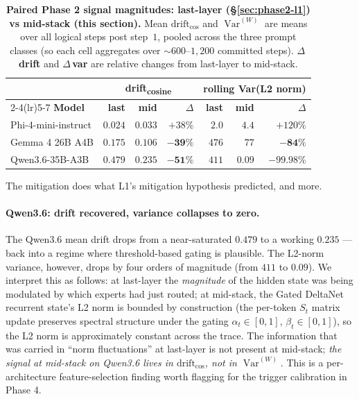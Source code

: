 \documentclass[11pt,letterpaper]{article}
\newcommand{\drift}{\mathrm{drift}_{\cos}}
\newcommand{\Var}{\operatorname{Var}}
\begin{document}
\begin{table}[t]
\centering
\small
\caption{
\textbf{Paired Phase 2 signal magnitudes: last-layer (\S\ref{sec:phase2-l1})
vs mid-stack (this section).}
Mean $\drift$ and $\Var^{(W)}$ are means over all logical steps post
step~$1$, pooled across the three prompt classes (so each cell
aggregates over $\sim 600$--$1{,}200$ committed steps).
\textbf{$\Delta$\,drift} and \textbf{$\Delta$\,var} are relative
changes from last-layer to mid-stack.
}
\label{tab:phase2-paired}
\setlength{\tabcolsep}{4pt}
\begin{tabular}{lrrrrrr}
\toprule
& \multicolumn{3}{c}{\textbf{drift\textsubscript{cosine}}} &
  \multicolumn{3}{c}{\textbf{rolling Var(L2 norm)}} \\
\cmidrule(lr){2-4}\cmidrule(lr){5-7}
\textbf{Model} &
\textbf{last} & \textbf{mid} & \textbf{$\Delta$} &
\textbf{last} & \textbf{mid} & \textbf{$\Delta$} \\
\midrule
Phi-4-mini-instruct & $0.024$ & $0.033$ & $+38\%$ & $2.0$ & $4.4$ & $+120\%$ \\
Gemma 4 26B A4B & $0.175$ & $0.106$ & $\mathbf{-39\%}$ & $476$ & $77$ & $\mathbf{-84\%}$ \\
Qwen3.6-35B-A3B & $\mathbf{0.479}$ & $\mathbf{0.235}$ & $\mathbf{-51\%}$ & $411$ & $\mathbf{0.09}$ & $\mathbf{-99.98\%}$ \\
\bottomrule
\end{tabular}
\end{table}

The mitigation does what L1's mitigation hypothesis predicted, and
more.

\paragraph{Qwen3.6: drift recovered, variance collapses to zero.}
The Qwen3.6 mean drift drops from a near-saturated $0.479$ to a working
$0.235$ — back into a regime where threshold-based gating is plausible.
The L2-norm variance, however, drops by four orders of magnitude
(from $411$ to $0.09$). We interpret this as follows: at last-layer the
\emph{magnitude} of the hidden state was being modulated by which
experts had just routed; at mid-stack, the Gated DeltaNet recurrent
state's L2 norm is bounded by construction (the per-token $S_t$ matrix
update preserves spectral structure under the gating $\alpha_t \in
[0,1]$, $\beta_t \in [0,1]$), so the L2 norm is approximately constant
across the trace. The information that was carried in
``norm fluctuations'' at last-layer is not present at mid-stack;
\emph{the signal at mid-stack on Qwen3.6 lives in $\drift$, not in
$\Var^{(W)}$}. This is a per-architecture feature-selection finding
worth flagging for the trigger calibration in Phase 4.
\end{document}
